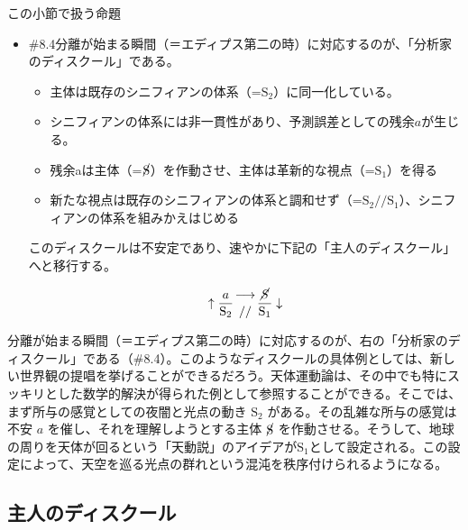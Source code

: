 \begin{note}{この小節で扱う命題}
  \begin{itemize}
    \tightlist
    \item{\#8.4}分離が始まる瞬間（＝エディプス第二の時）に対応するのが、「分析家のディスクール」である。
      \begin{itemize}
        \tightlist
        \item 主体は既存のシニフィアンの体系（=$\textrm{S}_2$）に同一化している。
        \item シニフィアンの体系には非一貫性があり、予測誤差としての残余$a$が生じる。
        \item 残余aは主体（=$\cancel{\textrm{S}}$）を作動させ、主体は革新的な視点（=$\textrm{S}_1$）を得る
        \item 新たな視点は既存のシニフィアンの体系と調和せず（=$\textrm{S}_2//\textrm{S}_1$）、シニフィアンの体系を組みかえはじめる
      \end{itemize}このディスクールは不安定であり、速やかに下記の「主人のディスクール」へと移行する。

$$
\uparrow\frac{a}{\mathrm{S_2}}\genfrac{}{}{0pt}{}{\longrightarrow}{//}\frac{\mathrm{\cancel{S}}}{\mathrm{S_1}}\downarrow
$$
  \end{itemize}
\end{note}

分離が始まる瞬間（＝エディプス第二の時）に対応するのが、右の「分析家のディスクール」である（\#8.4）。このようなディスクールの具体例としては、新しい世界観の提唱を挙げることができるだろう。天体運動論は、その中でも特にスッキリとした数学的解決が得られた例として参照することができる。そこでは、まず所与の感覚としての夜闇と光点の動き
\(\textrm{S}_2\) がある。その乱雑な所与の感覚は不安 \(a\)
を催し、それを理解しようとする主体 \(\cancel{\textrm{S}}\)
を作動させる。そうして、地球の周りを天体が回るという「天動説」のアイデアが\(\textrm{S}_1\)として設定される。この設定によって、天空を巡る光点の群れという混沌を秩序付けられるようになる。

\subsection{主人のディスクール}\label{ux4e3bux4ebaux306eux30c7ux30a3ux30b9ux30afux30fcux30eb}

